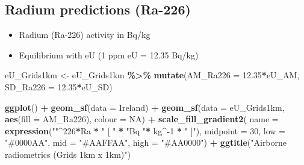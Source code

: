 \documentclass[
  12pt,
]{article}
\newenvironment{Shaded}{\begin{snugshade}}{\end{snugshade}}
\newcommand{\DataTypeTok}[1]{\textcolor[rgb]{0.13,0.29,0.53}{#1}}
\newcommand{\DecValTok}[1]{\textcolor[rgb]{0.00,0.00,0.81}{#1}}
\newcommand{\FloatTok}[1]{\textcolor[rgb]{0.00,0.00,0.81}{#1}}
\newcommand{\KeywordTok}[1]{\textcolor[rgb]{0.13,0.29,0.53}{\textbf{#1}}}
\newcommand{\NormalTok}[1]{#1}
\newcommand{\OperatorTok}[1]{\textcolor[rgb]{0.81,0.36,0.00}{\textbf{#1}}}
\newcommand{\OtherTok}[1]{\textcolor[rgb]{0.56,0.35,0.01}{#1}}
\newcommand{\StringTok}[1]{\textcolor[rgb]{0.31,0.60,0.02}{#1}}
\providecommand{\tightlist}{%
  \setlength{\itemsep}{0pt}\setlength{\parskip}{0pt}}
\begin{document}
\hypertarget{radium-predictions-ra-226}{%
\subsection{Radium predictions
(Ra-226)}\label{radium-predictions-ra-226}}

\begin{itemize}
\tightlist
\item
  Radium (Ra-226) activity in Bq/kg
\item
  Equilibrium with eU (1 ppm eU = 12.35 Bq/kg)
\end{itemize}

\begin{Shaded}
\begin{Highlighting}[]
\NormalTok{  eU\_Grids1km \textless{}{-}}\StringTok{ }\NormalTok{eU\_Grids1km }\OperatorTok{\%\textgreater{}\%}
\StringTok{    }\KeywordTok{mutate}\NormalTok{(}\DataTypeTok{AM\_Ra226 =} \FloatTok{12.35}\OperatorTok{*}\NormalTok{eU\_AM,}
           \DataTypeTok{SD\_Ra226 =} \FloatTok{12.35}\OperatorTok{*}\NormalTok{eU\_SD) }
\end{Highlighting}
\end{Shaded}

\begin{Shaded}
\begin{Highlighting}[]
  \KeywordTok{ggplot}\NormalTok{() }\OperatorTok{+}
\StringTok{    }\KeywordTok{geom\_sf}\NormalTok{(}\DataTypeTok{data =}\NormalTok{ Ireland) }\OperatorTok{+}
\StringTok{    }\KeywordTok{geom\_sf}\NormalTok{(}\DataTypeTok{data =}\NormalTok{ eU\_Grids1km, }\KeywordTok{aes}\NormalTok{(}\DataTypeTok{fill =}\NormalTok{ AM\_Ra226), }\DataTypeTok{colour =} \OtherTok{NA}\NormalTok{) }\OperatorTok{+}
\StringTok{    }\KeywordTok{scale\_fill\_gradient2}\NormalTok{(}
    \DataTypeTok{name =} \KeywordTok{expression}\NormalTok{(}\StringTok{""}\OperatorTok{\^{}}\DecValTok{226}\OperatorTok{*}\NormalTok{Ra }\OperatorTok{*}\StringTok{ " [ "} \OperatorTok{*}\StringTok{ "Bq "}\OperatorTok{*}\StringTok{ }\NormalTok{kg}\OperatorTok{\^{}{-}}\DecValTok{1} \OperatorTok{*}\StringTok{ " ]"}\NormalTok{),}
    \DataTypeTok{midpoint =} \DecValTok{30}\NormalTok{, }
    \DataTypeTok{low   =} \StringTok{"\#0000AA"}\NormalTok{,}
    \DataTypeTok{mid   =} \StringTok{"\#AAFFAA"}\NormalTok{,}
    \DataTypeTok{high  =} \StringTok{"\#AA0000"}\NormalTok{) }\OperatorTok{+}
\StringTok{    }\KeywordTok{ggtitle}\NormalTok{(}\StringTok{"Airborne radiometrics (Grids 1km x 1km)"}\NormalTok{) }
\end{Highlighting}
\end{Shaded}
\end{document}
